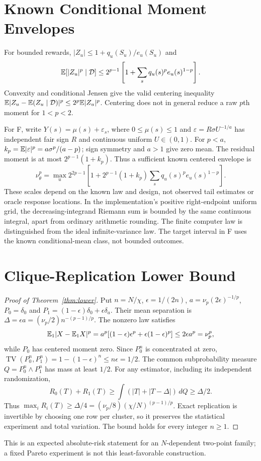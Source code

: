 \section{Known Conditional Moment Envelopes}
\label{app:envelopes}
For bounded rewards, $|Z_u|\le1+q_u(S_u)/e_u(S_u)$ and
\[
 \mathbb{E}[|Z_u|^p\mid\mathcal D]\le2^{p-1}\left[1+\sum_s q_u(s)^p e_u(s)^{1-p}\right].
\]
Convexity and conditional Jensen give the valid centering inequality
$\mathbb{E}|Z_u-\mathbb{E}(Z_u\mid\mathcal D)|^p\le2^p\mathbb{E}|Z_u|^p$.
Centering does not in general reduce a raw $p$th moment for $1<p<2$.

For F, write $Y(s)=\mu(s)+\varepsilon_s$, where $0\le\mu(s)\le1$ and $\varepsilon=R\sigma U^{-1/a}$ has independent fair sign $R$ and continuous uniform $U\in(0,1)$. For $p<a$,
$k_p=\mathbb{E}|\varepsilon|^p=a\sigma^p/(a-p)$; sign symmetry and $a>1$ give zero mean. The residual moment is at most $2^{p-1}(1+k_p)$. Thus a sufficient known centered envelope is
\[
 \nu_\theta^p=\max_u2^{2p-1}\left[1+2^{p-1}(1+k_p)\sum_s q_u(s)^p e_u(s)^{1-p}\right].
\]
These scales depend on the known law and design, not observed tail estimates or oracle response locations. In the implementation's positive right-endpoint uniform grid, the decreasing-integrand Riemann sum is bounded by the same continuous integral, apart from ordinary arithmetic rounding. The finite computer law is distinguished from the ideal infinite-variance law. The target interval in F uses the known conditional-mean class, not bounded outcomes.

\section{Clique-Replication Lower Bound}
\label{app:lower}
\begin{proof}[Proof of Theorem~\ref{thm:lower}]
Put $n=N/\chi$, $\epsilon=1/(2n)$, $a=\nu_p(2\epsilon)^{-1/p}$, $P_0=\delta_0$ and $P_1=(1-\epsilon)\delta_0+\epsilon\delta_a$. Their mean separation is $\Delta=\epsilon a=(\nu_p/2)n^{-(p-1)/p}$. The nonzero law satisfies
\[
 \mathbb{E}_1|X-\mathbb{E}_1X|^p=a^p[(1-\epsilon)\epsilon^p+\epsilon(1-\epsilon)^p]
 \le2\epsilon a^p=\nu_p^p,
\]
while $P_0$ has centered moment zero. Since $P_0^n$ is concentrated at zero,
$\operatorname{TV}(P_0^n,P_1^n)=1-(1-\epsilon)^n\le n\epsilon=1/2$.
The common subprobability measure $Q=P_0^n\wedge P_1^n$ has mass at least $1/2$. For any estimator, including its independent randomization,
\[
 R_0(T)+R_1(T)\ge\int(|T|+|T-\Delta|)\,dQ\ge\Delta/2.
\]
Thus $\max_iR_i(T)\ge\Delta/4=(\nu_p/8)(\chi/N)^{(p-1)/p}$. Exact replication is invertible by choosing one row per cluster, so it preserves the statistical experiment and total variation. The bound holds for every integer $n\ge1$.
\end{proof}
This is an expected absolute-risk statement for an $N$-dependent two-point family; a fixed Pareto experiment is not this least-favorable construction.


